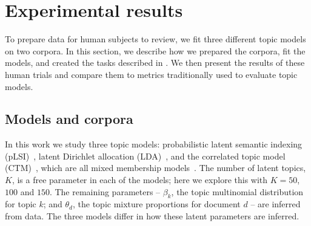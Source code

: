\section{Experimental results}
\label{sec:experiments}

To prepare data for human subjects to review, we fit three different
topic models on two corpora.  In this section, we describe how we
prepared the corpora, fit the models, and created the tasks described
in .  We then present the results of these human
trials and compare them to metrics traditionally used to evaluate
topic models.

\subsection{Models and corpora}
\label{sec:expermodels}

In this work we study three topic models: probabilistic latent
semantic indexing (pLSI)~\cite{hofmann-99}, latent Dirichlet
allocation (LDA)~\cite{blei-03}, and the correlated topic model
(CTM)~\cite{blei-06}, which are all mixed membership
models~\cite{Erosheva:2004ph}.  The number of latent topics, $K$, is a free
parameter in each of the models; here we explore this with $K=50$,
$100$ and $150$.  The remaining parameters -- $\beta_k$, the topic
multinomial distribution for topic $k$; and $\theta_d$, the topic
mixture proportions for document $d$ -- are inferred from data.  The
three models differ in how these latent parameters are inferred.


